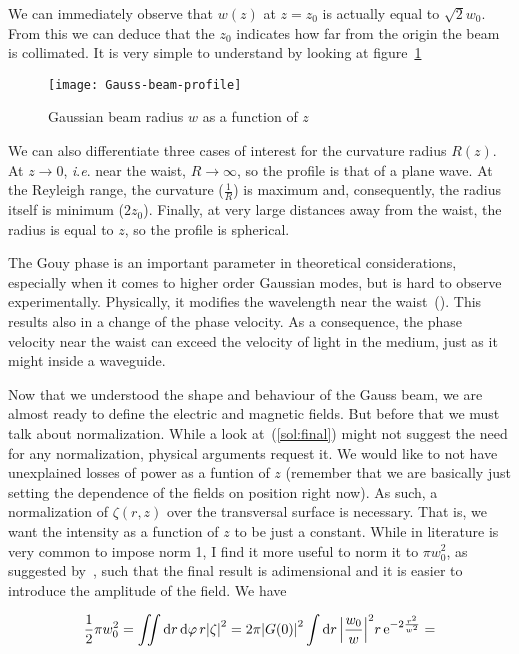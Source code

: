 \documentclass[12pt, class=report, crop=false]{standalone}
\begin{document}
We can immediately observe that \(w(z)\) at \(z=z_0\) is actually equal to \(\sqrt{2}w_0\). From this we can deduce that the \(z_0\) indicates how far from the origin the beam is collimated. It is very simple to understand by looking at figure~\cref{fig:gauss-beam}

\begin{figure}[h]
  \centering
  \texttt{[image: Gauss-beam-profile]}%
  \caption{Gaussian beam radius \(w\) as a function of \(z\)}\label{fig:gauss-beam}%
\end{figure}

We can also differentiate three cases of interest for the curvature radius \(R(z)\). At \(z\rightarrow 0\), \textit{i}.\textit{e}. near the waist, \(R\rightarrow\infty\), so the profile is that of a plane wave. At the Reyleigh range, the curvature (\(\frac{1}{R}\)) is maximum and, consequently, the radius itself is minimum (\(2z_0\)). Finally, at very large distances away from the waist, the radius is equal to \(z\), so the profile is spherical.

The Gouy phase is an important parameter in theoretical considerations, especially when it comes to higher order Gaussian modes, but is hard to observe experimentally. Physically, it modifies the wavelength near the waist~(\cite{paschottaArticleGouyPhase}). This results also in a change of the phase velocity. As a consequence, the phase velocity near the waist can exceed the velocity of light in the medium, just as it might inside a waveguide.

Now that we understood the shape and behaviour of the Gauss beam, we are almost ready to define the electric and magnetic fields. But before that we must talk about normalization. While a look at~(\ref{sol:final}) might not suggest the need for any normalization, physical arguments request it. We would like to not have unexplained losses of power as a funtion of \(z\) (remember that we are basically just setting the dependence of the fields on position right now). As such, a normalization of \(\zeta(r,z)\) over the transversal surface is necessary. That is, we want the intensity as a function of \(z\) to be just a constant. While in literature is very common to impose norm 1, I find it more useful to norm it to \(\pi w_0^2\), as suggested by~\cite{donderaElectronsTwistedFields2020}, such that the final result is adimensional and it is easier to introduce the amplitude of the field. We have

\begin{equation*}
  \frac{1}{2}\pi w_0^2 = \iint \dd{r}\dd{\varphi} r\abs{\zeta}^2 = 2 \pi \abs{G(0)}^2 \int \dd{r} \abs{\frac{w_0}{w}}^2 r \operatorname{e}^{-2\frac{r^2}{w^2}} =
\end{equation*}
\end{document}

